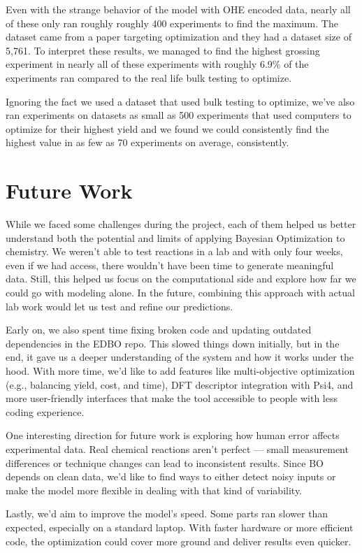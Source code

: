 \documentclass[12pt]{article}
\begin{document}
Even with the strange behavior of the model with OHE encoded data, nearly all of these only ran roughly roughly 400 experiments to find the maximum. The dataset came from a paper targeting optimization and they had a dataset size of 5,761. To interpret these results, we managed to find the highest grossing experiment in nearly all of these experiments with roughly 6.9\% of the experiments ran compared to the real life bulk testing to optimize.

Ignoring the fact we used a dataset that used bulk testing to optimize, we’ve also ran experiments on datasets as small as 500 experiments that used computers to optimize for their highest yield and we found we could consistently find the highest value in as few as 70 experiments on average, consistently.

\section{Future Work}
While we faced some challenges during the project, each of them helped us better understand both the potential and limits of applying Bayesian Optimization to chemistry. We weren’t able to test reactions in a lab and with only four weeks, even if we had access, there wouldn’t have been time to generate meaningful data. Still, this helped us focus on the computational side and explore how far we could go with modeling alone. In the future, combining this approach with actual lab work would let us test and refine our predictions.

Early on, we also spent time fixing broken code and updating outdated dependencies in the EDBO repo. This slowed things down initially, but in the end, it gave us a deeper understanding of the system and how it works under the hood. With more time, we’d like to add features like multi-objective optimization (e.g., balancing yield, cost, and time), DFT descriptor integration with Psi4, and more user-friendly interfaces that make the tool accessible to people with less coding experience.

One interesting direction for future work is exploring how human error affects experimental data. Real chemical reactions aren’t perfect — small measurement differences or technique changes can lead to inconsistent results. Since BO depends on clean data, we’d like to find ways to either detect noisy inputs or make the model more flexible in dealing with that kind of variability.

Lastly, we’d aim to improve the model’s speed. Some parts ran slower than expected, especially on a standard laptop. With faster hardware or more efficient code, the optimization could cover more ground and deliver results even quicker.
\end{document}
